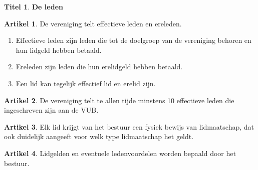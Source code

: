 \documentclass[a4paper,10pt]{article}
\theoremstyle{definition}
\newtheorem{titel}{\newline\Large Titel}
\newtheorem{artikelbase}{\large Artikel}
\newenvironment{artikel}
  {\begin{artikelbase}}
  {\smallskip
   \end{artikelbase}}
\newcommand{\ttext}[1]{\Large \textbf{#1} \normalsize}
\newcommand{\ttextcr}{\hfill\newline}
\begin{document}
\begin{titel}\ttext{De leden}

  \begin{artikel}\ttextcr
    De vereniging telt effectieve leden en ereleden.
    \begin{enumerate}
      \item
        Effectieve leden zijn leden die tot de doelgroep van de vereniging behoren en hun lidgeld hebben betaald.
      \item
        Ereleden zijn leden die hun erelidgeld hebben betaald.
      \item
        Een lid kan tegelijk effectief lid en erelid zijn.
    \end{enumerate}
  \end{artikel}

  \begin{artikel}\ttextcr
    De vereniging telt te allen tijde minstens 10 effectieve leden die ingeschreven zijn aan de VUB.
  \end{artikel}

  \begin{artikel}\ttextcr
    Elk lid krijgt van het bestuur een fysiek bewijs van lidmaatschap, dat ook duidelijk aangeeft voor welk type lidmaatschap het geldt.
  \end{artikel}

  \begin{artikel}\ttextcr
    Lidgelden en eventuele ledenvoordelen worden bepaald door het bestuur.
  \end{artikel}

\end{titel}

\end{document}
